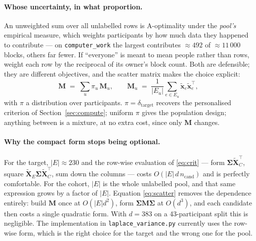\documentclass[11pt]{article}
\newcommand{\bx}{\bm{x}}
\newcommand{\bS}{\bm{\Sigma}}
\newcommand{\bM}{\bm{M}}
\newcommand{\bX}{\bm{X}}
\begin{document}
\paragraph{Whose uncertainty, in what proportion.} An unweighted sum over all unlabelled rows is
A-optimality under the \emph{pool's} empirical measure, which weights participants by how much
data they happened to contribute --- on \texttt{computer\_work} the largest contributes
$\approx 492$ of $\approx 11\,000$ blocks, others far fewer. If ``everyone'' is meant to mean
people rather than rows, weight each row by the reciprocal of its owner's block count. Both are
defensible; they are different objectives, and the scatter matrix makes the choice explicit:
\begin{equation}
  \bM \;=\; \sum_{u} \pi_u \, \bM_u,
  \qquad
  \bM_u \;=\; \frac{1}{|E_u|}\sum_{e \in E_u} \tilde{\bx}_e \tilde{\bx}_e^{\!\top} ,
  \label{eq:mmix}
\end{equation}
with $\pi$ a distribution over participants. $\pi = \delta_{\text{target}}$ recovers the
personalised criterion of Section~\ref{sec:compute}; uniform $\pi$ gives the population design;
anything between is a mixture, at no extra cost, since only $\bM$ changes.

\paragraph{Why the compact form stops being optional.} For the target, $|E| \approx 230$ and the
row-wise evaluation of \eqref{eq:crit} --- form $\bS\tilde{\bX}_C^{\!\top}$, square
$\tilde{\bX}_E\bS\tilde{\bX}_C^{\!\top}$, sum down the columns --- costs
$O(|E|\,d\,n_{\text{cand}})$ and is perfectly comfortable. For the cohort, $|E|$ is the whole
unlabelled pool, and that same expression grows by a factor of $|E|$. Equation
\eqref{eq:scatter} removes the dependence entirely: build $\bM$ once at $O(|E| d^2)$, form
$\bS\bM\bS$ at $O(d^3)$, and each candidate then costs a single quadratic form. With $d = 383$
on a 43-participant split this is negligible. The implementation in
\texttt{laplace\_variance.py} currently uses the row-wise form, which is the right choice for
the target and the wrong one for the pool.
\end{document}
